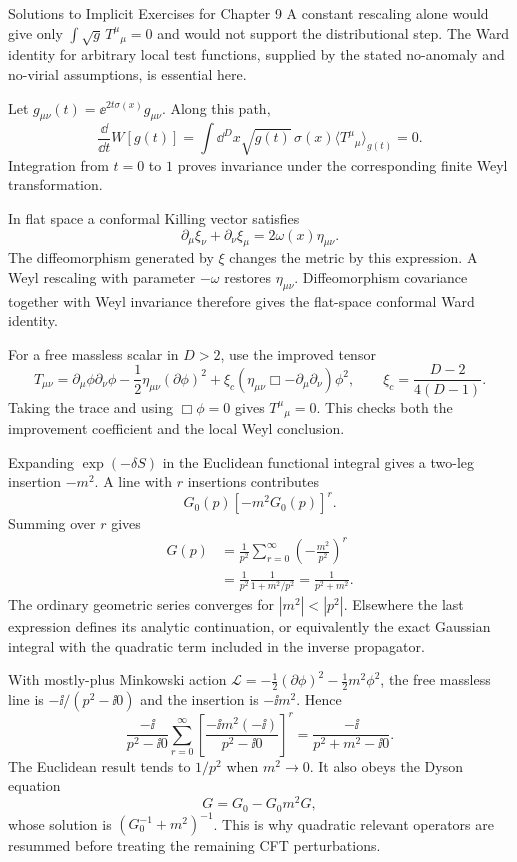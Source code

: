 \begin{bankssolutions}{Solutions to Implicit Exercises for Chapter 9}
A constant rescaling alone would give only
$\int\sqrt g\,T^\mu{}_{\mu}=0$ and would not support the distributional step.
The Ward identity for arbitrary local test functions, supplied by the stated
no-anomaly and no-virial assumptions, is essential here.

Let $g_{\mu\nu}(t)=\ee^{2t\sigma(x)}g_{\mu\nu}$.  Along this path,
\[
  \frac{\dd}{\dd t}W[g(t)]
  =\int\dd^D x\sqrt{g(t)}\,\sigma(x)
  \langle T^\mu{}_{\mu}\rangle_{g(t)}=0.
\]
Integration from $t=0$ to $1$ proves invariance under the corresponding finite
Weyl transformation.

In flat space a conformal Killing vector satisfies
\[
  \partial_\mu\xi_\nu+\partial_\nu\xi_\mu=2\omega(x)\eta_{\mu\nu}.
\]
The diffeomorphism generated by $\xi$ changes the metric by this expression.
A Weyl rescaling with parameter $-\omega$ restores $\eta_{\mu\nu}$.  Diffeomorphism
covariance together with Weyl invariance therefore gives the flat-space
conformal Ward identity.

For a free massless scalar in $D>2$, use the improved tensor
\[
  T_{\mu\nu}=\partial_\mu\phi\partial_\nu\phi
  -\frac12\eta_{\mu\nu}(\partial\phi)^2
  +\xi_c(\eta_{\mu\nu}\Box-\partial_\mu\partial_\nu)\phi^2,
  \qquad
  \xi_c=\frac{D-2}{4(D-1)}.
\]
Taking the trace and using $\Box\phi=0$ gives
$T^\mu{}_{\mu}=0$.  This checks both the improvement coefficient and the
local Weyl conclusion.

Expanding $\exp(-\delta S)$ in the Euclidean functional integral gives a
two-leg insertion $-m^2$.  A line with $r$ insertions contributes
\[
  G_0(p)[-m^2G_0(p)]^r.
\]
Summing over $r$ gives
\begin{align*}
  G(p)&=\frac1{p^2}\sum_{r=0}^\infty
  \left(-\frac{m^2}{p^2}\right)^r\\
  &=\frac1{p^2}\frac1{1+m^2/p^2}
   =\frac1{p^2+m^2}.
\end{align*}
The ordinary geometric series converges for $|m^2|<|p^2|$.  Elsewhere the
last expression defines its analytic continuation, or equivalently the exact
Gaussian integral with the quadratic term included in the inverse
propagator.

With mostly-plus Minkowski action
$\mathcal L=-\frac12(\partial\phi)^2-\frac12m^2\phi^2$, the free massless line is
$-\ii/(p^2-\ii0)$ and the insertion is $-\ii m^2$.  Hence
\[
  \frac{-\ii}{p^2-\ii0}
  \sum_{r=0}^\infty
  \left[\frac{-\ii m^2(-\ii)}{p^2-\ii0}\right]^r
  =\frac{-\ii}{p^2+m^2-\ii0}.
\]
The Euclidean result tends to $1/p^2$ when $m^2\to0$.  It also obeys the
Dyson equation
\[
  G=G_0-G_0m^2G,
\]
whose solution is $(G_0^{-1}+m^2)^{-1}$.  This is why quadratic relevant
operators are resummed before treating the remaining CFT perturbations.


\end{bankssolutions}
